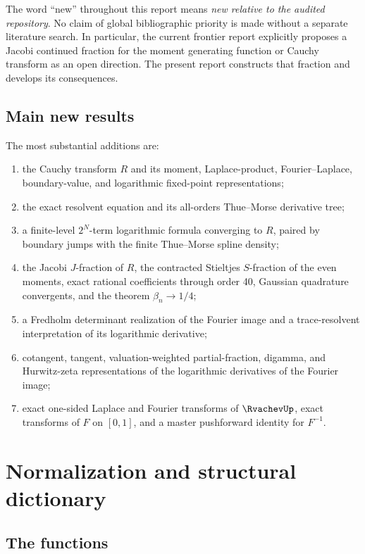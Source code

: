 \documentclass[11pt]{article}
\theoremstyle{definition}
\theoremstyle{remark}
\begin{document}
The word ``new'' throughout this report means \emph{new relative to the audited repository}.
No claim of global bibliographic priority is made without a separate literature search.
In particular, the current frontier report explicitly proposes a Jacobi continued fraction
for the moment generating function or Cauchy transform as an open direction.  The present
report constructs that fraction and develops its consequences.

\subsection{Main new results}

The most substantial additions are:

\begin{enumerate}
\item the Cauchy transform \(R\) and its moment, Laplace-product, Fourier--Laplace,
      boundary-value, and logarithmic fixed-point representations;
\item the exact resolvent equation and its all-orders Thue--Morse derivative tree;
\item a finite-level \(2^N\)-term logarithmic formula converging to \(R\), paired by
      boundary jumps with the finite Thue--Morse spline density;
\item the Jacobi \(J\)-fraction of \(R\), the contracted Stieltjes \(S\)-fraction of the
      even moments, exact rational coefficients through order 40, Gaussian quadrature
      convergents, and the theorem \(\beta_n\to1/4\);
\item a Fredholm determinant realization of the Fourier image and a trace-resolvent
      interpretation of its logarithmic derivative;
\item cotangent, tangent, valuation-weighted partial-fraction, digamma, and Hurwitz-zeta
      representations of the logarithmic derivatives of the Fourier image;
\item exact one-sided Laplace and Fourier transforms of \(\RvachevUp\), exact transforms of
      \(F\) on \([0,1]\), and a master pushforward identity for \(F^{-1}\).
\end{enumerate}

\section{Normalization and structural dictionary}

\subsection{The functions}
\end{document}

